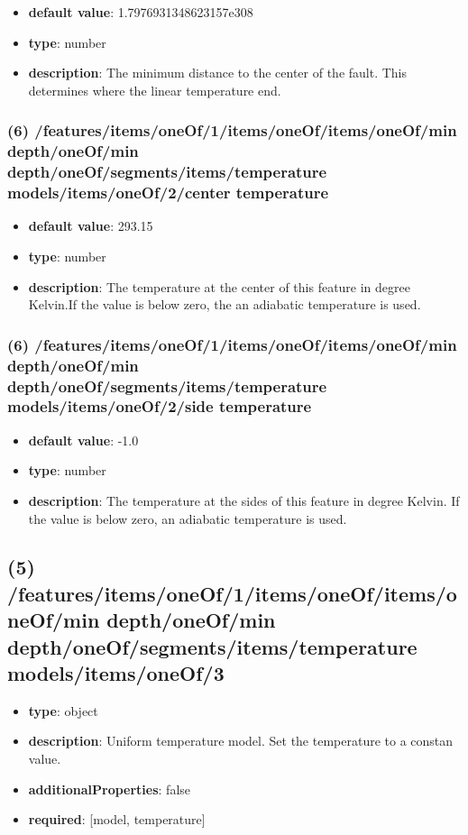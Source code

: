 \begin{itemize}[leftmargin=6em]\item {\bf default value}: 1.7976931348623157e308
\item {\bf type}: number
\item {\bf description}: The minimum distance to the center of the fault. This determines where the linear temperature end.
\end{itemize}\subsubsection{(6) /features/items/oneOf/1/items/oneOf/items/oneOf/min depth/oneOf/min depth/oneOf/segments/items/temperature models/items/oneOf/2/center temperature}
\begin{itemize}[leftmargin=6em]\item {\bf default value}: 293.15
\item {\bf type}: number
\item {\bf description}: The temperature at the center of this feature in degree Kelvin.If the value is below zero, the an adiabatic temperature is used.
\end{itemize}\subsubsection{(6) /features/items/oneOf/1/items/oneOf/items/oneOf/min depth/oneOf/min depth/oneOf/segments/items/temperature models/items/oneOf/2/side temperature}
\begin{itemize}[leftmargin=6em]\item {\bf default value}: -1.0
\item {\bf type}: number
\item {\bf description}: The temperature at the sides of this feature in degree Kelvin. If the value is below zero, an adiabatic temperature is used.
\end{itemize}\subsection{(5) /features/items/oneOf/1/items/oneOf/items/oneOf/min depth/oneOf/min depth/oneOf/segments/items/temperature models/items/oneOf/3}
\begin{itemize}[leftmargin=5em]\item {\bf type}: object
\item {\bf description}: Uniform temperature model. Set the temperature to a constan value.
\item {\bf additionalProperties}: false
\item {\bf required}: [model, temperature]\end{itemize}
